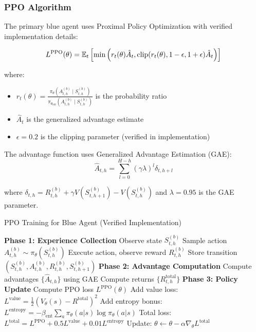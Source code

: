 \documentclass[11pt]{article}
\theoremstyle{definition}
\theoremstyle{plain}
\begin{document}
\subsubsection{PPO Algorithm}

The primary blue agent uses Proximal Policy Optimization with verified implementation details:

\begin{equation}
L^{\text{PPO}}(\theta) = \mathbb{E}_{t}\left[\min\left(r_t(\theta)\hat{A}_t, \text{clip}(r_t(\theta), 1-\epsilon, 1+\epsilon)\hat{A}_t\right)\right]
\end{equation}

where:
\begin{itemize}
    \item $r_t(\theta) = \frac{\pi_\theta(A_{t,h}^{(b)} \mid S_{t,h}^{(b)})}{\pi_{\theta_{\text{old}}}(A_{t,h}^{(b)} \mid S_{t,h}^{(b)})}$ is the probability ratio
    \item $\hat{A}_t$ is the generalized advantage estimate
    \item $\epsilon = 0.2$ is the clipping parameter (verified in implementation)
\end{itemize}

The advantage function uses Generalized Advantage Estimation (GAE):
\begin{equation}
\hat{A}_{t,h} = \sum_{l=0}^{H-h} (\gamma \lambda)^l \delta_{t,h+l}
\end{equation}

where $\delta_{t,h} = R_{t,h}^{(b)} + \gamma V(S_{t,h+1}^{(b)}) - V(S_{t,h}^{(b)})$ and $\lambda = 0.95$ is the GAE parameter.

\begin{algorithm}
\caption{PPO Training for Blue Agent (Verified Implementation)}
\begin{algorithmic}[1]
\STATE \textbf{Phase 1: Experience Collection}
        \STATE Observe state $S_{t,h}^{(b)}$
        \STATE Sample action $A_{t,h}^{(b)} \sim \pi_\theta(S_{t,h}^{(b)})$
        \STATE Execute action, observe reward $R_{t,h}^{(b)}$
        \STATE Store transition $(S_{t,h}^{(b)}, A_{t,h}^{(b)}, R_{t,h}^{(b)}, S_{t,h+1}^{(b)})$
    \ENDFOR
\ENDFOR
\STATE \textbf{Phase 2: Advantage Computation}
\STATE Compute advantages $\{\hat{A}_{t,h}\}$ using GAE
\STATE Compute returns $\{R_{t,h}^{\text{total}}\}$
\STATE \textbf{Phase 3: Policy Update}
        \STATE Compute PPO loss $L^{\text{PPO}}(\theta)$
        \STATE Add value loss: $L^{\text{value}} = \frac{1}{2}(V_\theta(s) - R^{\text{total}})^2$
        \STATE Add entropy bonus: $L^{\text{entropy}} = -\beta_{\text{ent}} \sum_a \pi_\theta(a|s) \log \pi_\theta(a|s)$
        \STATE Total loss: $L^{\text{total}} = L^{\text{PPO}} + 0.5 L^{\text{value}} + 0.01 L^{\text{entropy}}$
        \STATE Update: $\theta \leftarrow \theta - \alpha \nabla_\theta L^{\text{total}}$
    \ENDFOR
\ENDFOR
\end{algorithmic}
\end{algorithm}
\end{document}
